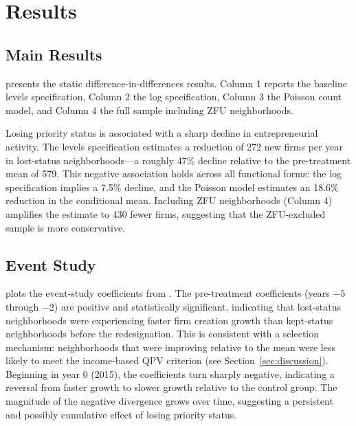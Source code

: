 \documentclass[12pt]{article}
\begin{document}
\section{Results}

\subsection{Main Results}

 presents the static difference-in-differences results. Column 1 reports the baseline levels specification, Column 2 the log specification, Column 3 the Poisson count model, and Column 4 the full sample including ZFU neighborhoods.

\begin{table}[H]
\caption{Effect of Losing Priority Status on Firm Creation}
\label{tab:main_did}

\end{table}

Losing priority status is associated with a sharp decline in entrepreneurial activity. The levels specification estimates a reduction of 272 new firms per year in lost-status neighborhoods---a roughly 47\% decline relative to the pre-treatment mean of 579. This negative association holds across all functional forms: the log specification implies a 7.5\% decline, and the Poisson model estimates an 18.6\% reduction in the conditional mean. Including ZFU neighborhoods (Column 4) amplifies the estimate to 430 fewer firms, suggesting that the ZFU-excluded sample is more conservative.

\subsection{Event Study}

 plots the event-study coefficients from . The pre-treatment coefficients (years $-5$ through $-2$) are positive and statistically significant, indicating that lost-status neighborhoods were experiencing faster firm creation growth than kept-status neighborhoods before the redesignation. This is consistent with a selection mechanism: neighborhoods that were improving relative to the mean were less likely to meet the income-based QPV criterion (see Section~\ref{sec:discussion}). Beginning in year 0 (2015), the coefficients turn sharply negative, indicating a reversal from faster growth to slower growth relative to the control group. The magnitude of the negative divergence grows over time, suggesting a persistent and possibly cumulative effect of losing priority status.
\end{document}
